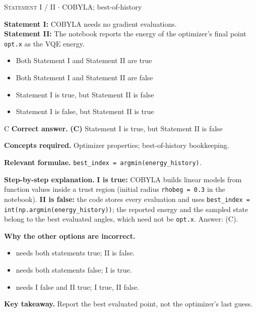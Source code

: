 \documentclass[11pt,a4paper]{article}
\newcommand{\optlabel}[1]{\textbf{(#1)}}
\newcommand{\correctlabel}[1]{\textcolor{okgreen}{\textbf{(#1)}\,\ding{51}}}
\newenvironment{qitem}[1]{\begin{list}{}{\setlength{\leftmargin}{3.3em}\setlength{\labelwidth}{3.1em}%
  \setlength{\labelsep}{0.2em}\setlength{\topsep}{3pt}\setlength{\parsep}{3pt}}\item[\textbf{Q.#1}\hfill]}{\end{list}}
\newcommand{\qsep}{\par\vspace{2pt}{\color{black!15}\hrule}\vspace{4pt}}
\newcommand{\qmeta}[2]{{\footnotesize\color{black!60}\textsc{#1} \;$\cdot$\; #2}\par}
\begin{document}
\begin{qitem}{52}
\qmeta{Statement I / II}{COBYLA; best-of-history}
\textbf{Statement I:} COBYLA needs no gradient evaluations.\\[1mm]
\textbf{Statement II:} The notebook reports the energy of the optimizer's final point \texttt{opt.x} as the VQE energy.
\begin{itemize}[leftmargin=2.6em, labelsep=0.4em, itemsep=2pt, topsep=3pt]
\item[\optlabel{A}] Both Statement I and Statement II are true
\item[\optlabel{B}] Both Statement I and Statement II are false
\item[\correctlabel{C}] Statement I is true, but Statement II is false
\item[\optlabel{D}] Statement I is false, but Statement II is true
\end{itemize}
\end{qitem}
\begin{solbox}{C}
\textbf{\color{brand}Correct answer.} \textcolor{okgreen}{\textbf{(C)}} Statement I is true, but Statement II is false

\textbf{\color{brand}Concepts required.} Optimizer properties; best-of-history bookkeeping.

\textbf{\color{brand}Relevant formulae.} \texttt{best\_index = argmin(energy\_history)}.

\textbf{\color{brand}Step-by-step explanation.} \textbf{I is true:} COBYLA builds linear models from function values inside a trust region (initial radius \texttt{rhobeg = 0.3} in the notebook).
\textbf{II is false:} the code stores every evaluation and uses \texttt{best\_index = int(np.argmin(energy\_history))}; the reported energy and the sampled
state belong to the best evaluated angles, which need not be \texttt{opt.x}. Answer: (C).

\textbf{\color{brand}Why the other options are incorrect.}
\begin{itemize}[leftmargin=2.4em, itemsep=1pt, topsep=2pt]
\item[\textbf{(A)}] needs both statements true; II is false.
\item[\textbf{(B)}] needs both statements false; I is true.
\item[\textbf{(D)}] needs I false and II true; I true, II false.
\end{itemize}
\textbf{\color{brand}Key takeaway.} Report the best evaluated point, not the optimizer's last guess.
\end{solbox}
\qsep
\end{document}
